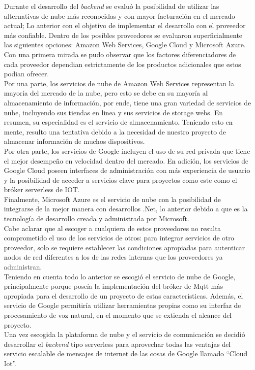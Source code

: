 
Durante el desarrollo del \textit{backend} se evaluó la posibilidad de utilizar las alternativas de nube más reconocidas y con mayor facturación en el mercado actual; Lo anterior con el objetivo de implementar el desarrollo con el proveedor más confiable. Dentro de los posibles proveedores se evaluaron superficialmente las siguientes opciones: Amazon Web Services, Google Cloud y Microsoft Azure. Con una primera mirada se pudo observar que los factores diferenciadores de cada proveedor dependian estrictamente de los productos adicionales que estos podian ofrecer.
\vspace{0.5cm}\\
Por una parte, los servicios de nube de Amazon Web Services representan la mayoría del mercado de la nube, pero esto se debe en su mayoría al almacenamiento de información, por ende, tiene una gran variedad de servicios de nube, incluyendo sus tiendas en linea y sus servicios de storage webs. En resumen, su especialidad es el servicio de almacenamiento. Teniendo esto en mente, resulto una tentativa debido a la necesidad de nuestro proyecto de almacenar información de muchos dispositivos.
\vspace{0.5cm}\\
Por otra parte, los servicios de Google incluyen el uso de su red privada que tiene el mejor desempeño en velocidad dentro del mercado. En adición, los servicios de Google Cloud poseen interfaces de administración con más experiencia de usuario y la posibilidad de acceder a servicios clave para proyectos como este como el bróker serverless de IOT.
\vspace{0.5cm}\\
Finalmente, Microsoft Azure es el servicio de nube con la posibilidad de integrarse de la mejor manera con desarrollos .Net, lo anterior debido a que es la tecnología de desarrollo creada y administrada por Microsoft.
\vspace{0.5cm}\\
Cabe aclarar que al escoger a cualquiera de estos proveedores no resulta comprometido el uso de los servicios de otros: para integrar servicios de otro proveedor, solo se requiere establecer las condiciones apropiadas para autenticar nodos de red diferentes a los de las redes internas que los proveedores ya administran.
\vspace{0.5cm}\\
Teniendo en cuenta todo lo anterior se escogió el servicio de nube de Google, principalmente porque poseía la implementación del bróker de Mqtt más apropiada para el desarrollo de un proyecto de estas características. Además, el servicio de Google permitiría utilizar herramientas propias como su interfaz de procesamiento de voz natural, en el momento que se extienda el alcance del proyecto.
\vspace{0.5cm}\\
Una vez escogida la plataforma de nube y el servicio de comunicación se decidió desarrollar el \textit{backend} tipo serverless para aprovechar todas las ventajas del servicio escalable de mensajes de internet de las cosas de Google llamado ``Cloud Iot''.

